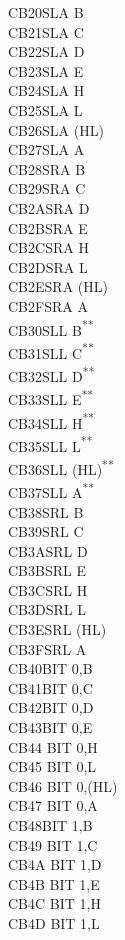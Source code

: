 \documentclass[twoside,openright,a4paper]{book}
\newcommand{\UNDOC}{\textnormal{\textsuperscript{**}}}
\begin{document}
\begin{multicols}{3}
{\begin{tabbing}
	CB20\>SLA B\\
	CB21\>SLA C\\
	CB22\>SLA D\\
	CB23\>SLA E\\
	CB24\>SLA H\\
	CB25\>SLA L\\
	CB26\>SLA (HL)\\
	CB27\>SLA A\\
	CB28\>SRA B\\
	CB29\>SRA C\\
	CB2A\>SRA D\\
	CB2B\>SRA E\\
	CB2C\>SRA H\\
	CB2D\>SRA L\\
	CB2E\>SRA (HL)\\
	CB2F\>SRA A\\
	CB30\>SLL B\UNDOC\\
	CB31\>SLL C\UNDOC\\
	CB32\>SLL D\UNDOC\\
	CB33\>SLL E\UNDOC\\
	CB34\>SLL H\UNDOC\\
	CB35\>SLL L\UNDOC\\
	CB36\>SLL (HL)\UNDOC\\
	CB37\>SLL A\UNDOC\\
	CB38\>SRL B\\
	CB39\>SRL C\\
	CB3A\>SRL D\\
	CB3B\>SRL E\\
	CB3C\>SRL H\\
	CB3D\>SRL L\\
	CB3E\>SRL (HL)\\
	CB3F\>SRL A\\
	CB40\>BIT 0,B\\
	CB41\>BIT 0,C\\
	CB42\>BIT 0,D\\
	CB43\>BIT 0,E\\
	CB44\> 	BIT 0,H\\
	CB45\> 	BIT 0,L\\
	CB46\> 	BIT 0,(HL)\\
	CB47\> 	BIT 0,A\\
	CB48\>BIT 1,B\\
	CB49\> 	BIT 1,C\\
	CB4A\> 	BIT 1,D\\
	CB4B\> 	BIT 1,E\\
	CB4C\> 	BIT 1,H\\
	CB4D\> 	BIT 1,L\\

\end{tabbing}}
\end{multicols}
\end{document}
